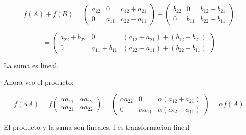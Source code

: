 \begin{enumerate}[label=(\alph*)]
  \[
  f(A) + f(B) =
  \begin{pmatrix} a_{22} & 0 & a_{12} + a_{21} \\ 0 & a_{11} & a_{22} - a_{11} \end{pmatrix} +
  \begin{pmatrix} b_{22} & 0 & b_{12} + b_{21} \\ 0 & b_{11} & b_{22} - b_{11} \end{pmatrix}
  \]
  
  \[
  =
  \begin{pmatrix} a_{22} + b_{22} & 0 & (a_{12} + a_{21}) + (b_{12} + b_{21}) \\ 0 & a_{11} + b_{11} & (a_{22} - a_{11}) + (b_{22} - b_{11}) \end{pmatrix}
  \]
  
  La suma es lineal.
  
  Ahora veo el producto:
  
  \[
  f(\alpha A) =
  f \begin{pmatrix} \alpha a_{11} & \alpha a_{12} \\ \alpha a_{21} & \alpha a_{22} \end{pmatrix}
  =
  \begin{pmatrix} \alpha a_{22} & 0 & \alpha (a_{12} + a_{21}) \\ 0 & \alpha a_{11} & \alpha (a_{22} - a_{11}) \end{pmatrix}
  = \alpha f(A)
  \]
  
  El producto y la suma son lineales, f es transformacion lineal

\end{enumerate}

\begin{aportes}
  \item {} 
\end{aportes}